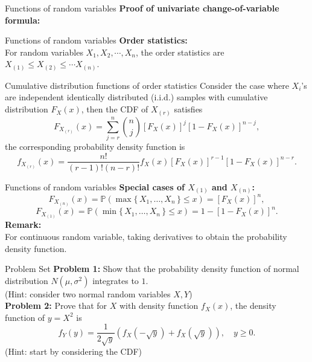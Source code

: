 \documentclass [aspectratio=169]{beamer}
\begin{document}
\begin{frame}{Functions of random variables}
\textbf{Proof of univariate change-of-variable formula:}
\vspace{2.5in}
\end{frame}

\begin{frame}{Functions of random variables}
\textbf{Order statistics:}\\
For random variables $X_1, X_2, \cdots, X_n$, the order statistics are $X_{(1)} \le X_{(2)} \le \cdots X_{(n)}$.\\

\begin{block}{Cumulative distribution functions of order statistics}
Consider the case where $X_i$'s are independent identically distributed (i.i.d.) samples with cumulative distribution ${\displaystyle F_{X}(x)}$, then the CDF of $X_{(r)}$ satisfies
$$
{\displaystyle F_{X_{(r)}}(x)=\sum _{j=r}^{n}{\binom {n}{j}}[F_{X}(x)]^{j}[1-F_{X}(x)]^{n-j}},
$$
the corresponding probability density function is
$$
{\displaystyle f_{X_{(r)}}(x)={\frac {n!}{(r-1)!(n-r)!}}f_{X}(x)[F_{X}(x)]^{r-1}[1-F_{X}(x)]^{n-r}.}
$$
\end{block}
\end{frame}

\begin{frame}{Functions of random variables}
\textbf{Special cases of $X_{(1)}$ and $X_{(n)}$:}\\
$$
{\displaystyle F_{X_{(n)}}(x)=\mathbb{P} (\max\{\,X_{1},\ldots ,X_{n}\,\}\leq x)=[F_{X}(x)]^{n}}, 
$$
$$
{\displaystyle F_{X_{(1)}}(x)=\mathbb{P} (\min\{\,X_{1},\ldots ,X_{n}\,\}\leq x)=1-[1-F_{X}(x)]^{n}}.
$$
\vspace{0.1in}
\textbf{Remark:}\\
For continuous random variable, taking derivatives to obtain the probability density function. 
\end{frame}


\begin{frame}{Problem Set}
    \textbf{Problem 1:}  Show that the probability density function of normal distribution $N(\mu, \sigma^2)$ integrates to $1$. \\
    (Hint: consider two normal random variables $X, Y$)\\
    \vspace{0.1in}
     \textbf{Problem 2:} Prove that for $X$ with density function $f_X(x)$, the density function of $y = X^2$ is
     $$
     f_Y(y) = \dfrac{1}{2\sqrt{y}}(f_X(-\sqrt{y}) + f_X(\sqrt{y}) ), \quad y \ge 0.
     $$
     (Hint: start by considering the CDF)
 \vspace{0.1in}
\end{frame}
\end{document}
